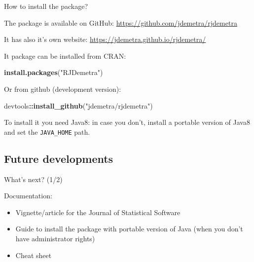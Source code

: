 \documentclass[10pt,xcolor=table,color={dvipsnames,usenames},ignorenonframetext,usepdftitle=false,french]{beamer}
\newenvironment{Shaded}{\begin{snugshade}}{\end{snugshade}}
\newcommand{\KeywordTok}[1]{\textcolor[rgb]{0.13,0.29,0.53}{\textbf{#1}}}
\newcommand{\NormalTok}[1]{#1}
\newcommand{\OperatorTok}[1]{\textcolor[rgb]{0.81,0.36,0.00}{\textbf{#1}}}
\newcommand{\StringTok}[1]{\textcolor[rgb]{0.31,0.60,0.02}{#1}}
\begin{document}
\begin{frame}[fragile]{How to install the package?}
\protect\hypertarget{how-to-install-the-package}{}

The package is available on GitHub:
\url{https://github.com/jdemetra/rjdemetra}

It has also it's own website:
\url{https://jdemetra.github.io/rjdemetra/}

It package can be installed from CRAN:

\begin{Shaded}
\begin{Highlighting}[]
\KeywordTok{install.packages}\NormalTok{(}\StringTok{"RJDemetra"}\NormalTok{)}
\end{Highlighting}
\end{Shaded}

Or from github (development version):

\begin{Shaded}
\begin{Highlighting}[]
\NormalTok{devtools}\OperatorTok{::}\KeywordTok{install_github}\NormalTok{(}\StringTok{"jdemetra/rjdemetra"}\NormalTok{)}
\end{Highlighting}
\end{Shaded}

\bcinfo To install it you need Java8: in case you don't, install a
portable version of Java8 and set the \texttt{JAVA\_HOME} path.

\end{frame}

\hypertarget{future-developments}{%
\subsection{Future developments}\label{future-developments}}

\begin{frame}{What's next? \bcpanchant (1/2)}
\protect\hypertarget{whats-next-12}{}

Documentation:

\begin{itemize}
\item
  Vignette/article for the Journal of Statistical Software
\item
  Guide to install the package with portable version of Java (when you
  don't have administrator rights)
\item
  Cheat sheet
\end{itemize}

\end{frame}
\end{document}
